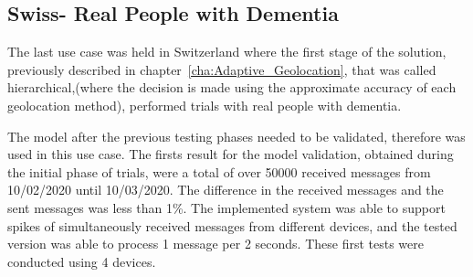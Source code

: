 \subsection{Swiss- Real People with Dementia} %
\label{subsec:Use_case_Swiss}


The last use case was held in Switzerland where the first stage of the solution, previously described in chapter~\ref{cha:Adaptive_Geolocation}, that was called hierarchical,(where the decision is made using the approximate accuracy of each geolocation method), performed trials with real people with dementia. 

The model after the previous testing phases  needed to be validated, therefore was used in this use case. The firsts result for the model validation, obtained during the initial phase of trials, were a total of over 50000 received messages from 10/02/2020 until 10/03/2020. The difference in the received messages and the sent messages was less than 1\%. The implemented system was able to support spikes of simultaneously received messages from different devices, and the tested version was able to process 1 message per 2 seconds. These first tests were conducted using 4 devices.

